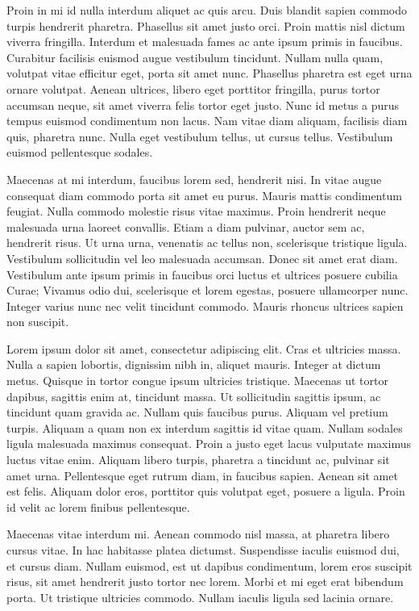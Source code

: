 Proin in mi id nulla interdum aliquet ac quis arcu. Duis blandit
sapien commodo turpis hendrerit pharetra. Phasellus sit amet justo
orci. Proin mattis nisl dictum viverra fringilla. Interdum et
malesuada fames ac ante ipsum primis in faucibus. Curabitur facilisis
euismod augue vestibulum tincidunt. Nullam nulla quam, volutpat vitae
efficitur eget, porta sit amet nunc. Phasellus pharetra est eget urna
ornare volutpat. Aenean ultrices, libero eget porttitor fringilla,
purus tortor accumsan neque, sit amet viverra felis tortor eget
justo. Nunc id metus a purus tempus euismod condimentum non lacus. Nam
vitae diam aliquam, facilisis diam quis, pharetra nunc. Nulla eget
vestibulum tellus, ut cursus tellus. Vestibulum euismod pellentesque
sodales.

Maecenas at mi interdum, faucibus lorem sed, hendrerit nisi. In vitae
augue consequat diam commodo porta sit amet eu purus. Mauris mattis
condimentum feugiat. Nulla commodo molestie risus vitae maximus. Proin
hendrerit neque malesuada urna laoreet convallis. Etiam a diam
pulvinar, auctor sem ac, hendrerit risus. Ut urna urna, venenatis ac
tellus non, scelerisque tristique ligula. Vestibulum sollicitudin vel
leo malesuada accumsan. Donec sit amet erat diam. Vestibulum ante
ipsum primis in faucibus orci luctus et ultrices posuere cubilia
Curae; Vivamus odio dui, scelerisque et lorem egestas, posuere
ullamcorper nunc. Integer varius nunc nec velit tincidunt
commodo. Mauris rhoncus ultrices sapien non suscipit.


Lorem ipsum dolor sit amet, consectetur adipiscing elit. Cras et
ultricies massa. Nulla a sapien lobortis, dignissim nibh in, aliquet
mauris. Integer at dictum metus. Quisque in tortor congue ipsum
ultricies tristique. Maecenas ut tortor dapibus, sagittis enim at,
tincidunt massa. Ut sollicitudin sagittis ipsum, ac tincidunt quam
gravida ac. Nullam quis faucibus purus. Aliquam vel pretium
turpis. Aliquam a quam non ex interdum sagittis id vitae quam. Nullam
sodales ligula malesuada maximus consequat. Proin a justo eget lacus
vulputate maximus luctus vitae enim. Aliquam libero turpis, pharetra a
tincidunt ac, pulvinar sit amet urna. Pellentesque eget rutrum diam,
in faucibus sapien. Aenean sit amet est felis. Aliquam dolor eros,
porttitor quis volutpat eget, posuere a ligula. Proin id velit ac
lorem finibus pellentesque.

Maecenas vitae interdum mi. Aenean commodo nisl massa, at pharetra
libero cursus vitae. In hac habitasse platea dictumst. Suspendisse
iaculis euismod dui, et cursus diam. Nullam euismod, est ut dapibus
condimentum, lorem eros suscipit risus, sit amet hendrerit justo
tortor nec lorem. Morbi et mi eget erat bibendum porta. Ut tristique
ultricies commodo. Nullam iaculis ligula sed lacinia ornare.

